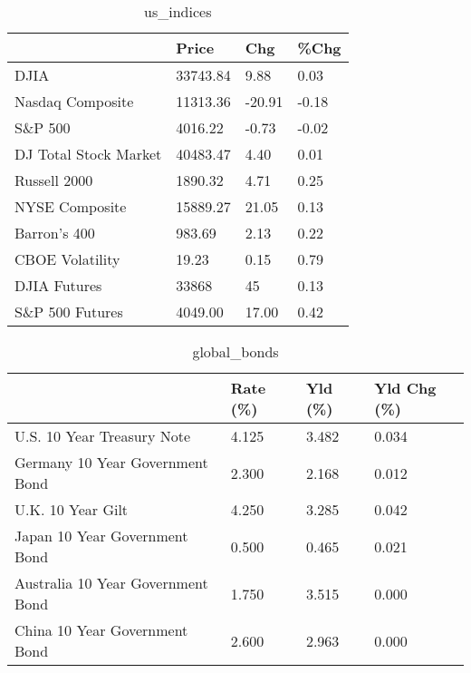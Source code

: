 \documentclass{article}%
\begin{document}
%


\begin{table}[htbp]%
\caption{us\_indices}%
\centering%
\begin{adjustbox}{width=1\textwidth}%
\begin{tabular}{llll}
\toprule
                      &    Price &    Chg &  \%Chg \\
\midrule
                 DJIA & 33743.84 &   9.88 &  0.03 \\
     Nasdaq Composite & 11313.36 & -20.91 & -0.18 \\
              S\&P 500 &  4016.22 &  -0.73 & -0.02 \\
DJ Total Stock Market & 40483.47 &   4.40 &  0.01 \\
         Russell 2000 &  1890.32 &   4.71 &  0.25 \\
       NYSE Composite & 15889.27 &  21.05 &  0.13 \\
         Barron's 400 &   983.69 &   2.13 &  0.22 \\
      CBOE Volatility &    19.23 &   0.15 &  0.79 \\
         DJIA Futures &    33868 &     45 &  0.13 \\
      S\&P 500 Futures &  4049.00 &  17.00 &  0.42 \\
\bottomrule
\end{tabular}
%
\end{adjustbox}%
\end{table}

%


\begin{table}[htbp]%
\caption{global\_bonds}%
\centering%
\begin{adjustbox}{width=1\textwidth}%
\begin{tabular}{llll}
\toprule
                                  & Rate (\%) & Yld (\%) & Yld Chg (\%) \\
\midrule
       U.S. 10 Year Treasury Note &    4.125 &   3.482 &       0.034 \\
  Germany 10 Year Government Bond &    2.300 &   2.168 &       0.012 \\
                U.K. 10 Year Gilt &    4.250 &   3.285 &       0.042 \\
    Japan 10 Year Government Bond &    0.500 &   0.465 &       0.021 \\
Australia 10 Year Government Bond &    1.750 &   3.515 &       0.000 \\
    China 10 Year Government Bond &    2.600 &   2.963 &       0.000 \\
\bottomrule
\end{tabular}
%
\end{adjustbox}%
\end{table}
\end{document}
